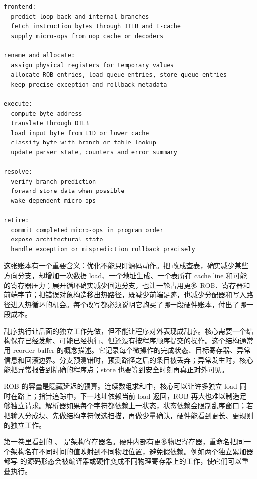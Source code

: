 \begin{lstlisting}[numbers=none,caption={一轮热循环迭代的硬件账本}]
frontend:
  predict loop-back and internal branches
  fetch instruction bytes through ITLB and I-cache
  supply micro-ops from uop cache or decoders

rename and allocate:
  assign physical registers for temporary values
  allocate ROB entries, load queue entries, store queue entries
  keep precise exception and rollback metadata

execute:
  compute byte address
  translate through DTLB
  load input byte from L1D or lower cache
  classify byte with branch or table lookup
  update parser state, counters and error summary

resolve:
  verify branch prediction
  forward store data when possible
  wake dependent micro-ops

retire:
  commit completed micro-ops in program order
  expose architectural state
  handle exception or misprediction rollback precisely
\end{lstlisting}

这张账本有一个重要含义：优化不能只盯源码动作。把  改成查表，确实减少某些方向分支，却增加一次数据 load、一个地址生成、一个表所在 cache line 和可能的寄存器压力；展开循环确实减少回边分支，也让一轮占用更多 ROB、寄存器和前端字节；把错误对象构造移出热路径，既减少前端足迹，也减少分配器和写入路径进入热循环的机会。每个改写都必须说明它购买了哪一段硬件账本，付出了哪一段成本。

乱序执行让后面的独立工作先做，但不能让程序对外表现成乱序。核心需要一个结构保存已经发射、可能已经执行、但还没有按程序顺序提交的操作。这个结构通常用 reorder buffer 的概念描述。它记录每个微操作的完成状态、目标寄存器、异常信息和回滚边界。分支预测错时，预测路径之后的条目被丢弃；异常发生时，核心能把异常报告到精确的程序点；store 也要等到安全时刻再真正对外可见。

ROB 的容量是隐藏延迟的预算。连续数组求和中，核心可以让许多独立 load 同时在路上；指针追踪中，下一地址依赖当前 load 返回，ROB 再大也难以制造足够独立请求。解析器如果每个字符都依赖上一状态，状态依赖会限制乱序窗口；若把输入分成块、先做结构字符候选扫描，再做少量确认，硬件能看到更长、更规则的独立工作。

第一卷里看到的 、 是架构寄存器名。硬件内部有更多物理寄存器，重命名把同一个架构名在不同时间的值映射到不同物理位置，避免假依赖。例如两个独立累加器都写  的源码形态会被编译器或硬件变成不同物理寄存器上的工作，使它们可以重叠执行。

